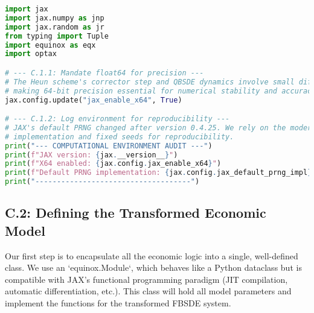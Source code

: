 \documentclass[11pt,letterpaper,oneside]{article}
\theoremstyle{plain}
\theoremstyle{definition}
\theoremstyle{remark}
\begin{document}
\begin{lstlisting}[language=Python, caption={C.1: Reproducibility and Precision Audit.}, label={lst:audit_app_appendix}]
import jax
import jax.numpy as jnp
import jax.random as jr
from typing import Tuple
import equinox as eqx
import optax

# --- C.1.1: Mandate float64 for precision ---
# The Heun scheme's corrector step and QBSDE dynamics involve small differences,
# making 64-bit precision essential for numerical stability and accuracy.
jax.config.update("jax_enable_x64", True)

# --- C.1.2: Log environment for reproducibility ---
# JAX's default PRNG changed after version 0.4.25. We rely on the modern 'threefry'
# implementation and fixed seeds for reproducibility.
print("--- COMPUTATIONAL ENVIRONMENT AUDIT ---")
print(f"JAX version: {jax.__version__}")
print(f"X64 enabled: {jax.config.jax_enable_x64}")
print(f"Default PRNG implementation: {jax.config.jax_default_prng_impl}")
print("------------------------------------")
\end{lstlisting}

\subsection{C.2: Defining the Transformed Economic Model}
Our first step is to encapsulate all the economic logic into a single, well-defined class. We use an `equinox.Module`, which behaves like a Python dataclass but is compatible with JAX's functional programming paradigm (JIT compilation, automatic differentiation, etc.). This class will hold all model parameters and implement the functions for the transformed FBSDE system.
\end{document}

